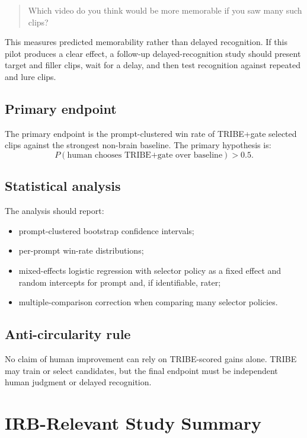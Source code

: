 \begin{quote}
Which video do you think would be more memorable if you saw many such clips?
\end{quote}

This measures predicted memorability rather than delayed recognition. If this
pilot produces a clear effect, a follow-up delayed-recognition study should
present target and filler clips, wait for a delay, and then test recognition
against repeated and lure clips.

\subsection{Primary endpoint}

The primary endpoint is the prompt-clustered win rate of TRIBE+gate selected
clips against the strongest non-brain baseline. The primary hypothesis is:
\[
P(\text{human chooses TRIBE+gate over baseline}) > 0.5.
\]

\subsection{Statistical analysis}

The analysis should report:
\begin{itemize}
  \item prompt-clustered bootstrap confidence intervals;
  \item per-prompt win-rate distributions;
  \item mixed-effects logistic regression with selector policy as a fixed effect
        and random intercepts for prompt and, if identifiable, rater;
  \item multiple-comparison correction when comparing many selector policies.
\end{itemize}

\subsection{Anti-circularity rule}

No claim of human improvement can rely on TRIBE-scored gains alone. TRIBE may
train or select candidates, but the final endpoint must be independent human
judgment or delayed recognition.

\section{IRB-Relevant Study Summary}

